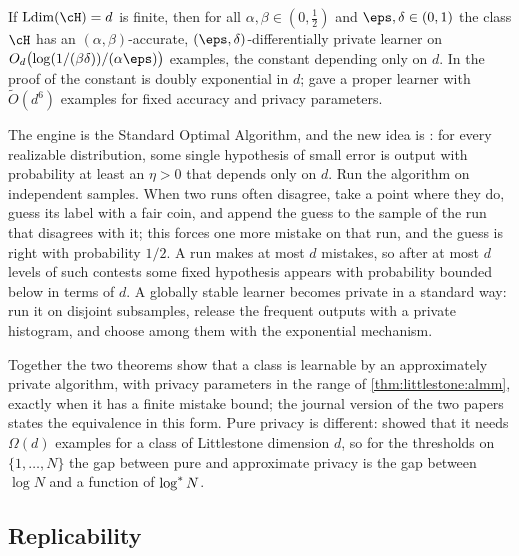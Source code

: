 \begin{refsection}
\begin{theorem}\label{thm:littlestone:blm}
If $\littlestoneLdim(\cH)=d$ is finite, then for all $\alpha,\beta\in(0,\frac12)$ and $\eps,\delta\in(0,1)$ the class $\cH$ has an $(\alpha,\beta)$-accurate, $(\eps,\delta)$-differentially private learner on $O_d\bigl(\log(1/(\beta\delta))/(\alpha\eps)\bigr)$ examples, the constant depending only on $d$. In the proof of \textcite{BunLivniMoran2020} the constant is doubly exponential in $d$; \textcite{GhaziGolowichKumarManurangsi2021} gave a proper learner with $\tilde O(d^6)$ examples for fixed accuracy and privacy parameters.
\end{theorem}

\begin{proofsketch}
The engine is the Standard Optimal Algorithm, and the new idea is : for every realizable distribution, some single hypothesis of small error is output with probability at least an $\eta>0$ that depends only on $d$. Run the algorithm on independent samples. When two runs often disagree, take a point where they do, guess its label with a fair coin, and append the guess to the sample of the run that disagrees with it; this forces one more mistake on that run, and the guess is right with probability $1/2$. A run makes at most $d$ mistakes, so after at most $d$ levels of such contests some fixed hypothesis appears with probability bounded below in terms of $d$. A globally stable learner becomes private in a standard way: run it on disjoint subsamples, release the frequent outputs with a private histogram, and choose among them with the exponential mechanism.
\end{proofsketch}

Together the two theorems show that a class is learnable by an approximately private algorithm, with privacy parameters in the range of \cref{thm:littlestone:almm}, exactly when it has a finite mistake bound; the journal version of the two papers \parencite{AlonBunLivniMalliarisMoran2022} states the equivalence in this form. Pure privacy is different: \textcite{FeldmanXiao2015} showed that it needs $\Omega(d)$ examples for a class of Littlestone dimension $d$, so for the thresholds on $\{1,\dots,N\}$ the gap between pure and approximate privacy is the gap between $\log N$ and a function of $\log^{*} N$.

\subsection{Replicability}\label{sec:littlestone:replicability}


\end{refsection}
